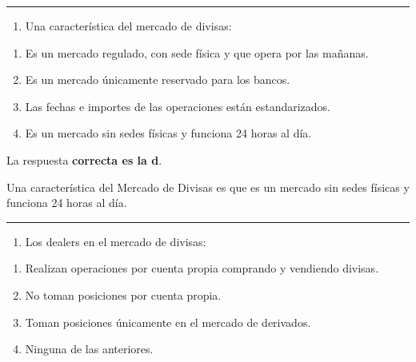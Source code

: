 \documentclass[
  letterpaper,
  DIV=11,
  numbers=noendperiod]{scrreprt}
\providecommand{\tightlist}{%
  \setlength{\itemsep}{0pt}\setlength{\parskip}{0pt}}\usepackage{longtable,booktabs,array}
\begin{document}
\begin{center}\rule{0.5\linewidth}{0.5pt}\end{center}

\begin{enumerate}
\def\labelenumi{\arabic{enumi}.}
\setcounter{enumi}{38}
\tightlist
\item
  Una característica del mercado de divisas:
\end{enumerate}

\begin{enumerate}
\def\labelenumi{\alph{enumi}.}
\item
  Es un mercado regulado, con sede física y que opera por las mañanas.
\item
  Es un mercado únicamente reservado para los bancos.
\item
  Las fechas e importes de las operaciones están estandarizados.
\item
  Es un mercado sin sedes físicas y funciona 24 horas al día.
\end{enumerate}

\begin{tcolorbox}[enhanced jigsaw, left=2mm, opacityback=0, colback=white, breakable, arc=.35mm, bottomrule=.15mm, rightrule=.15mm, toprule=.15mm, leftrule=.75mm, colframe=quarto-callout-tip-color-frame]
\begin{minipage}[t]{5.5mm}
\textcolor{quarto-callout-tip-color}{\faLightbulb}
\end{minipage}%
\begin{minipage}[t]{\textwidth - 5.5mm}

La respuesta \textbf{correcta es la d}.

Una característica del Mercado de Divisas es que es un mercado sin sedes
físicas y funciona 24 horas al día.

\end{minipage}%
\end{tcolorbox}

\begin{center}\rule{0.5\linewidth}{0.5pt}\end{center}

\begin{enumerate}
\def\labelenumi{\arabic{enumi}.}
\setcounter{enumi}{39}
\tightlist
\item
  Los dealers en el mercado de divisas:
\end{enumerate}

\begin{enumerate}
\def\labelenumi{\alph{enumi}.}
\item
  Realizan operaciones por cuenta propia comprando y vendiendo divisas.
\item
  No toman posiciones por cuenta propia.
\item
  Toman posiciones únicamente en el mercado de derivados.
\item
  Ninguna de las anteriores.
\end{enumerate}
\end{document}
